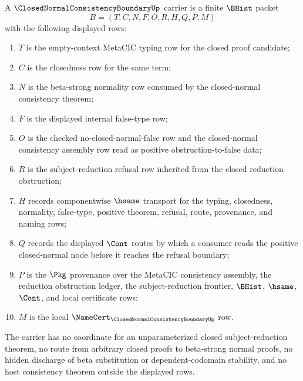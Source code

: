 \begin{definition}
\label{def:closed-normal-consistency-boundary-carrier}
A $\ClosedNormalConsistencyBoundaryUp$ carrier is a finite $\BHist$ packet
$$
B=(T,C,N,F,O,R,H,Q,P,M)
$$
with the following displayed rows:
\begin{enumerate}
\item $T$ is the empty-context MetaCIC typing row for the closed proof candidate;
\item $C$ is the closedness row for the same term;
\item $N$ is the beta-strong normality row consumed by the closed-normal consistency theorem;
\item $F$ is the displayed internal false-type row;
\item $O$ is the checked no-closed-normal-false row and the closed-normal consistency assembly row read as positive obstruction-to-false data;
\item $R$ is the subject-reduction refusal row inherited from the closed reduction obstruction;
\item $H$ records componentwise $\hsame$ transport for the typing, closedness, normality, false-type, positive theorem, refusal, route, provenance, and naming rows;
\item $Q$ records the displayed $\Cont$ routes by which a consumer reads the positive closed-normal node before it reaches the refusal boundary;
\item $P$ is the $\Pkg$ provenance over the MetaCIC consistency assembly, the reduction obstruction ledger, the subject-reduction frontier, $\BHist$, $\hsame$, $\Cont$, and local certificate rows;
\item $M$ is the local $\NameCert_{\ClosedNormalConsistencyBoundaryUp}$ row.
\end{enumerate}
The carrier has no coordinate for an unparameterized closed subject-reduction theorem, no route from arbitrary closed proofs to beta-strong normal proofs, no hidden discharge of beta substitution or dependent-codomain stability, and no host consistency theorem outside the displayed rows.
\end{definition}

